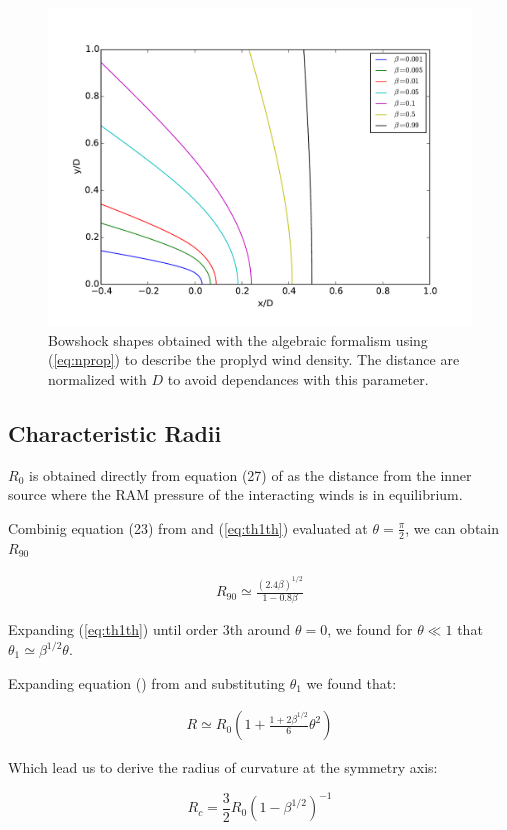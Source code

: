 \begin{figure}
\includegraphics[width=\linewidth]{r-beta}
\caption{Bowshock shapes obtained with the \citep{Canto:1996} algebraic formalism using (\ref{eq:nprop}) to describe the proplyd wind density. The distance are normalized with  $D$
to avoid dependances with this parameter. }
\end{figure}

\subsection{Characteristic Radii}

$R_0$ is obtained directly from equation (27) of \citep{Canto:1996} as the distance from the inner source where the RAM pressure of the interacting winds is in equilibrium.

Combinig equation (23) from \citep{Canto:1996} and  (\ref{eq:th1th}) evaluated at $\theta=\frac{\pi}{2}$, we can obtain $R_{90}$ 

\begin{align}
R_{90} \simeq \frac{\left(2.4\beta\right)^{1/2}}{1-0.8\beta}
\label{eq:r90}
\end{align}

Expanding (\ref{eq:th1th}) until order 3th around $\theta=0$, we found for $\theta \ll 1$ that $\theta_1\simeq \beta^{1/2}\theta$. 

Expanding equation () from \citep{Canto:1996} and substituting $\theta_1$ we found that:

\begin{align}
R \simeq R_0 \left(1+\frac{1+2\beta^{1/2}}{6}\theta^2\right)
\label{eq:R_approx}
\end{align}

Which lead us to derive the radius of curvature at the symmetry axis:

\begin{equation}
R_c = \frac{3}{2}R_0\left(1-\beta^{1/2}\right)^{-1}
\label{eq:Rcurv}
\end{equation}

